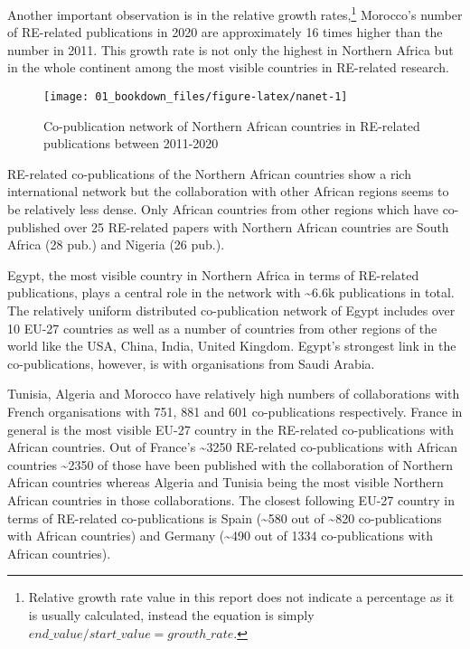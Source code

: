 \documentclass[12pt,twoside]{report}
\let\rmarkdownfootnote\footnote%
\def\footnote{\protect\rmarkdownfootnote}
\begin{document}
Another important observation is in the relative growth rates,\footnote{Relative growth rate value in this report does not indicate a percentage as
  it is usually calculated, instead the equation is simply \(end\_value/start\_value = growth\_rate\).} Morocco's number of
RE-related publications in 2020 are approximately 16 times higher than the number in 2011.
This growth rate is not only the highest in Northern Africa but in the whole continent among the most visible countries in RE-related research.

\begin{figure}
\texttt{[image: 01\_bookdown\_files/figure-latex/nanet-1]} \caption{Co-publication network of Northern African countries in RE-related publications between 2011-2020}\label{fig:nanet}
\end{figure}

RE-related co-publications of the Northern African countries show a rich international network but the collaboration with other African regions seems to be relatively less dense. Only African countries from other regions which have co-published over 25 RE-related papers with Northern African countries are South Africa (28 pub.) and Nigeria (26 pub.).

Egypt, the most visible country in Northern Africa in terms of RE-related publications, plays a central role in the network with \textasciitilde6.6k publications in total. The relatively uniform distributed co-publication network of Egypt includes over 10 EU-27 countries as well as a number of countries from other regions of the world like the USA, China, India, United Kingdom. Egypt's strongest link in the co-publications, however, is with organisations from Saudi Arabia.

Tunisia, Algeria and Morocco have relatively high numbers of collaborations with French organisations with 751, 881 and 601 co-publications respectively. France in general is the most visible EU-27 country in the RE-related co-publications with African countries. Out of France's \textasciitilde3250 RE-related co-publications with African countries \textasciitilde2350 of those have been published with the collaboration of Northern African countries whereas Algeria and Tunisia being the most visible Northern African countries in those collaborations. The closest following EU-27 country in terms of RE-related co-publications is Spain (\textasciitilde580 out of \textasciitilde820 co-publications with African countries) and Germany (\textasciitilde490 out of 1334 co-publications with African countries).
\end{document}
